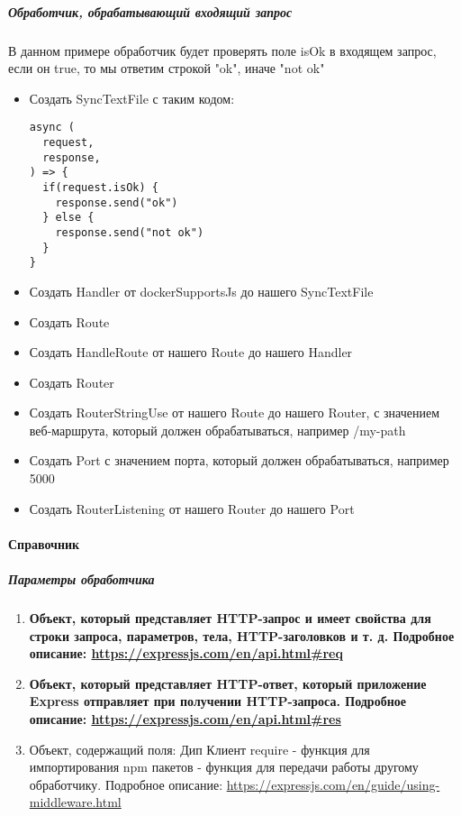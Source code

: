 \documentclass{article}
\begin{document}
\subparagraph{Обработчик, обрабатывающий входящий запрос}
В данном примере обработчик будет проверять поле isOk в входящем запрос, если
он true, то мы ответим строкой "ok", иначе "not ok"
\begin{itemize}
  \item Создать SyncTextFile с таким кодом:
        \begin{lstlisting}
async (
  request,
  response,
) => {
  if(request.isOk) {
    response.send("ok") 
  } else {
    response.send("not ok")
  }
}
\end{lstlisting}
  \item Создать Handler от dockerSupportsJs до нашего SyncTextFile
  \item Создать Route
  \item Создать HandleRoute от нашего Route до нашего Handler
  \item Создать Router
  \item Создать RouterStringUse от нашего Route до нашего Router, с значением
        веб-маршрута, который должен обрабатываться, например /my-path
  \item Создать Port с значением порта, который должен обрабатываться, например
        5000
  \item Создать RouterListening от нашего Router до нашего Port
\end{itemize}

\paragraph{Справочник}
\subparagraph{Параметры обработчика}
\begin{enumerate}
  \item \textbf{Объект, который представляет HTTP-запрос и имеет свойства для
          строки запроса, параметров, тела, HTTP-заголовков и т. д. Подробное
          описание:
          \url{https://expressjs.com/en/api.html#req}}
  \item \textbf{Объект, который представляет HTTP-ответ, который приложение
          Express отправляет при получении HTTP-запроса. Подробное описание:
          \url{https://expressjs.com/en/api.html#res}}
  \item Объект, содержащий поля:
         Дип Клиент
         require - функция для импортирования npm пакетов
         - функция для передачи работы другому обработчику.
        Подробное описание:
        \url{https://expressjs.com/en/guide/using-middleware.html}
\end{enumerate}
\end{document}
